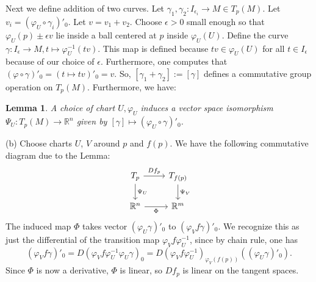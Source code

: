 \documentclass{amsart}
\numberwithin{equation}{section}
\theoremstyle{plain}
\newtheorem{lemma}[theorem]{Lemma}
\theoremstyle{definition}
\theoremstyle{remark}
\renewcommand{\_}[2]{\underbrace{#1}_{#2}}
\renewcommand{\^}[2]{\overbrace{#1}_{#2}}
\newcommand{\R}{\mathbb{R}}
\begin{document}
Next we define addition of two curves. Let $\gamma_1, \gamma_2: I_{\epsilon_i} \to M \in T_p(M)$. Let $v_i = (\varphi_U \circ \gamma_i)'_0$. Let $v = v_1+v_2$. Choose $\epsilon>0$ small enough so that $\varphi_U(p) \pm \epsilon v$ lie inside a ball centered at $p$ inside $\varphi_U(U)$. Define the curve $\gamma:I_\epsilon \to M, t\mapsto \varphi_U^{-1}(tv)$. This map is defined because $tv \in \varphi_U(U)$ for all $t\in I_\epsilon$ because of our choice of $\epsilon$. Furthermore, one computes that $(\varphi \circ \gamma)'_0 = (t\mapsto tv)'_0 = v$. So, $[\gamma_1 + \gamma_2] := [\gamma]$ defines a commutative group operation on $T_p(M)$. Furthermore, we have:

\begin{lemma}
  A choice of chart $U, \varphi_U$ induces a vector space isomorphism $\Psi_U: T_p(M) \to \R^n$ given by $[\gamma] \mapsto (\varphi_U\circ \gamma)'_0$.
\end{lemma}

(b) Choose charts $U$, $V$ around $p$ and $f(p)$. We have the following commutative diagram due to the Lemma:
\[\begin{tikzcd}
	{T_p} & {T_{f(p)}} \\
	{\R^n} & {\R^m}
	\arrow["{Df_p}", from=1-1, to=1-2]
	\arrow["{\Psi_U}", from=1-1, to=2-1]
	\arrow["{\Psi_V}", from=1-2, to=2-2]
	\arrow["\Phi"', from=2-1, to=2-2]
\end{tikzcd}\]
The induced map $\Phi$ takes vector $(\varphi_U \gamma)'_0$ to $(\varphi_V f \gamma)'_0$. We recognize this as just the differential of the transition map $\varphi_V f \varphi_U^{-1}$, since by chain rule, one has \[(\varphi_V f \gamma)'_0 = D(\varphi_V f \varphi_U^{-1} \varphi_U \gamma)_0 = D(\varphi_V f \varphi_U^{-1})_{\varphi_V(f(p))}\left((\varphi_U \gamma)'_0\right).\] Since $\Phi$ is now a derivative, $\Phi$ is linear, so $Df_p$ is linear on the tangent spaces. \\
\end{document}
